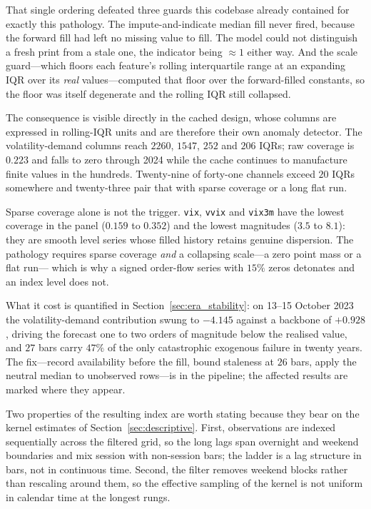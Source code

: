 That single ordering defeated three guards this codebase already contained for
exactly this pathology. The impute-and-indicate median fill never fired,
because the forward fill had left no missing value to fill. The model could not
distinguish a fresh print from a stale one, the indicator being $\approx 1$
either way. And the scale guard---which floors each feature's rolling
interquartile range at an expanding IQR over its \emph{real} values---computed
that floor over the forward-filled constants, so the floor was itself
degenerate and the rolling IQR still collapsed.

The consequence is visible directly in the cached design, whose columns are
expressed in rolling-IQR units and are therefore their own anomaly detector.
The volatility-demand columns reach $2260$, $1547$, $252$ and $206$ IQRs; raw
coverage is $0.223$ and falls to zero through 2024 while the cache continues to
manufacture finite values in the hundreds. Twenty-nine of forty-one channels
exceed $20$ IQRs somewhere and twenty-three pair that with sparse coverage or a
long flat run.

Sparse coverage alone is not the trigger. \texttt{vix}, \texttt{vvix} and
\texttt{vix3m} have the lowest coverage in the panel ($0.159$ to $0.352$) and
the lowest magnitudes ($3.5$ to $8.1$): they are smooth level series whose
filled history retains genuine dispersion. The pathology requires sparse
coverage \emph{and} a collapsing scale---a zero point mass or a flat run---
which is why a signed order-flow series with $15\%$ zeros detonates and an
index level does not.

What it cost is quantified in Section~\ref{sec:era_stability}: on 13--15
October 2023 the volatility-demand contribution swung to $-4.145$ against a
backbone of $+0.928$, driving the forecast one to two orders of magnitude below
the realised value, and $27$ bars carry $47\%$ of the only catastrophic
exogenous failure in twenty years. The fix---record availability before the
fill, bound staleness at $26$ bars, apply the neutral median to unobserved
rows---is in the pipeline; the affected results are marked where they appear.

Two properties of the resulting index are worth stating because they bear on
the kernel estimates of Section~\ref{sec:descriptive}. First, observations are
indexed sequentially across the filtered grid, so the long lags span overnight
and weekend boundaries and mix session with non-session bars; the ladder is a
lag structure in bars, not in continuous time. Second, the filter removes
weekend blocks rather than rescaling around them, so the effective sampling of
the kernel is not uniform in calendar time at the longest rungs.
